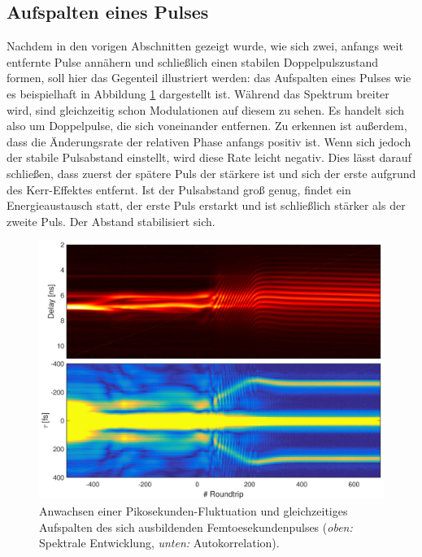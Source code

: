 \documentclass[bachelor,       %
               twoside,        %
               BCOR10mm,       %
               liststotoc,nomtotoc,bibtotoc, %
               english,ngerman, %
               final,          %
               ]{GAUBM}
\begin{document}
\clearpage
\subsection{Aufspalten eines Pulses}
Nachdem in den vorigen Abschnitten gezeigt wurde, wie sich zwei, anfangs weit entfernte Pulse annähern und schließlich einen stabilen Doppelpulszustand formen, soll hier das Gegenteil illustriert werden: das Aufspalten eines Pulses wie es beispielhaft in Abbildung \ref{fig:Splitting} dargestellt ist.
Während das Spektrum breiter wird, sind gleichzeitig schon Modulationen auf diesem zu sehen.
Es handelt sich also um Doppelpulse, die sich voneinander entfernen.
Zu erkennen ist außerdem, dass die Änderungsrate der relativen Phase anfangs positiv ist. Wenn sich jedoch der stabile Pulsabstand einstellt, wird diese Rate leicht negativ.
Dies lässt darauf schließen, dass zuerst der spätere Puls der stärkere ist und sich der erste aufgrund des Kerr-Effektes entfernt.
Ist der Pulsabstand groß genug, findet ein Energieaustausch statt, der erste Puls erstarkt und ist schließlich stärker als der zweite Puls.
Der Abstand stabilisiert sich.
\begin{figure}[!htb]
   \centering
   \includegraphics[width=\textwidth]{figures/4ms_25GSA_400m_Mlstart_Doppelpulse4_Splitting_93800}
   \caption{Anwachsen einer Pikosekunden-Fluktuation und gleichzeitiges Aufspalten des sich ausbildenden Femtoesekundenpulses (\textit{oben:} Spektrale Entwicklung, \textit{unten:} Autokorrelation).}
   \label{fig:Splitting}
\end{figure}
\end{document}
